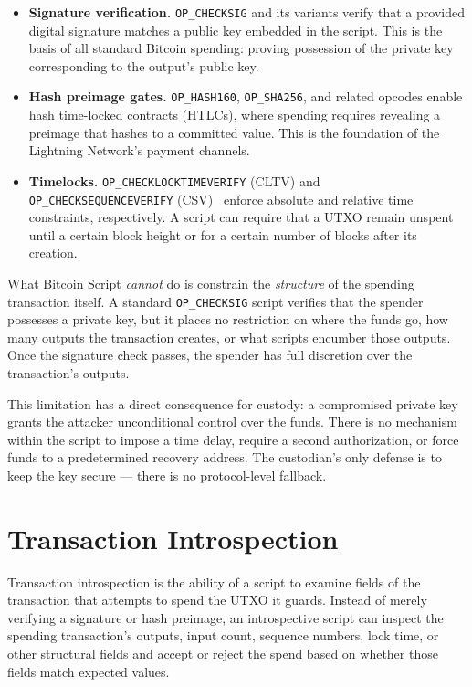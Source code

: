 \begin{itemize}
\item \textbf{Signature verification.} \texttt{OP\_CHECKSIG} and its variants verify
  that a provided digital signature matches a public key embedded in the script. This is
  the basis of all standard Bitcoin spending: proving possession of the private key
  corresponding to the output's public key.

\item \textbf{Hash preimage gates.} \texttt{OP\_HASH160}, \texttt{OP\_SHA256}, and
  related opcodes enable hash time-locked contracts (HTLCs), where spending requires
  revealing a preimage that hashes to a committed value. This is the foundation of the
  Lightning Network's payment channels.

\item \textbf{Timelocks.} \texttt{OP\_CHECKLOCKTIMEVERIFY} (CLTV) and
  \texttt{OP\_CHECKSEQUENCEVERIFY} (CSV)~\cite{BIP68, BIP112} enforce absolute and relative time constraints,
  respectively. A script can require that a UTXO remain unspent until a certain block
  height or for a certain number of blocks after its creation.
\end{itemize}

What Bitcoin Script \emph{cannot} do is constrain the \emph{structure} of the spending
transaction itself. A standard \texttt{OP\_CHECKSIG} script verifies that the spender
possesses a private key, but it places no restriction on where the funds go, how many
outputs the transaction creates, or what scripts encumber those outputs. Once the
signature check passes, the spender has full discretion over the transaction's outputs.

This limitation has a direct consequence for custody: a compromised private key grants
the attacker unconditional control over the funds. There is no mechanism within the
script to impose a time delay, require a second authorization, or force funds to a
predetermined recovery address. The custodian's only defense is to keep the key secure
--- there is no protocol-level fallback.

\section{Transaction Introspection} \label{se:introspection}

Transaction introspection is the ability of a script to examine fields of the
transaction that attempts to spend the UTXO it guards. Instead of merely verifying
a signature or hash preimage, an introspective script can inspect the spending
transaction's outputs, input count, sequence numbers, lock time, or other structural
fields and accept or reject the spend based on whether those fields match expected
values.

